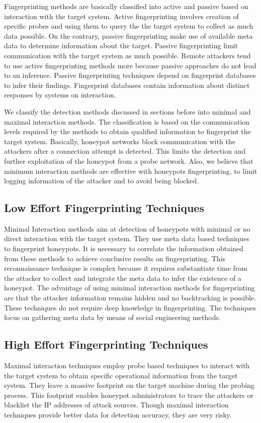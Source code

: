 \documentclass[../main.tex]{subfiles}
\begin{document}
Fingerprinting methods are basically classified into active and passive based on interaction with the target system. Active fingerprinting involves creation of specific probes and using them to query the the target system to collect as much data possible. On the contrary, passive fingerprinting  make use of available meta data to determine information about the target. Passive fingerprinting limit communication with the target system as much possible. Remote attackers tend to use active fingerprinting methods more because passive approaches do not lead to an inference. Passive fingerprinting techniques depend on fingerprint databases to infer their findings. Fingerprint databases contain information about distinct responses by systems on interaction.
   
   We classify the detection methods discussed in sections before into minimal and maximal interaction methods. The classification is based on the communication levels required by the methods to obtain qualified information to fingerprint the target system. Basically, honeypot networks block communication with the attackers after a connection attempt is detected. This limits the detection and further exploitation of the honeypot from a probe network. Also, we believe that minimum interaction methods are effective with honeypots fingerprinting, to limit logging information of the attacker and to avoid being blocked.  

 \subsection{Low Effort Fingerprinting Techniques}
 Minimal Interaction methods aim at detection of honeypots with minimal or no direct interaction with the target system. They use meta data based techniques to fingerprint honeypots. It is necessary to correlate the information obtained from these methods to achieve conclusive results on fingerprinting. This reconnaissance technique is complex because it requires substantiate time from the attacker to collect and integrate the meta data to infer the existence of a honeypot. The advantage of using minimal interaction methods for fingerprinting are that the attacker information remains hidden and no backtracking is possible. These techniques do not require deep knowledge in fingerprinting. The techniques focus on gathering meta data by means of social engineering methods. 
 
 
 \subsection{High Effort Fingerprinting Techniques}
Maximal interaction techniques employ probe based techniques to interact with the target system to obtain specific operational information from the target system. They leave a massive footprint on the target machine during the probing process. This footprint enables honeypot administrators to trace the attackers or blacklist the IP addresses of attack sources. Though maximal interaction techniques provide better data for detection accuracy, they are very risky.
\end{document}
